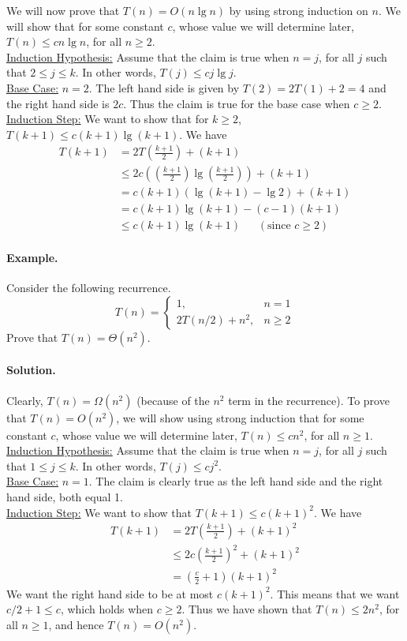 \documentclass[11pt,twoside]{article}
\def\ni{\noindent}
\begin{document}
\ni
We will now prove that $T(n)=O(n\lg n)$
by using strong induction on $n$. We will show that for 
some constant $c$, whose value we will determine later, $T(n)
\leq cn\lg n$, for all $n\geq 2$. \\
\underline{Induction Hypothesis:} Assume that the claim is true when
$n=j$, for all $j$ such that  $2\leq j\leq k$. In other words,
$T(j)\leq cj\lg j$. \\
\underline{Base Case:} $n=2$. The left
hand side is given by $T(2) = 2T(1) + 2 = 4$ and the right hand side
is $2c$. Thus the claim is true for the base case when $c\geq 2$.\\
\underline{Induction Step:} We want to show that for $k\geq 2$, $T(k+1)\leq
c(k+1)\lg (k+1)$. We have
\begin{align*}
T(k+1) & = 2T\left (\frac{k+1}{2}\right ) + (k+1) \\
       & \leq 2c\left (\left (\frac{k+1}{2}\right )\lg \left
(\frac{k+1}{2}\right )\right ) + (k+1) \\
       & = c(k+1)(\lg (k+1) - \lg 2)  + (k+1) \\
       & = c(k+1)\lg (k+1) - (c-1)(k+1)  \\
       & \leq c(k+1)\lg (k+1) ~~~~~~~ (\mbox{since } c\geq 2)
\end{align*}

\paragraph{Example.} Consider the following recurrence.
\[
T(n) = \left\{ \begin{array}{ll}
      1, & n = 1\\
      2T(n/2) + n^2, &  n \geq 2 
      \end{array} \right.
\]
Prove that $T(n)=\Theta(n^2)$.  
\paragraph{Solution.} Clearly, $T(n)=\Omega(n^2)$ (because of the
$n^2$ term in the recurrence). To prove that $T(n)=O(n^2)$, we will
show using strong induction that for 
some constant $c$, whose value we will determine later, $T(n)
\leq cn^2$, for all $n\geq 1$. \\
\underline{Induction Hypothesis:} Assume that the claim is true when
$n=j$, for all $j$ such that  $1\leq j\leq k$. In other words,
$T(j)\leq cj^2$. \\
\underline{Base Case:} $n=1$. The claim is clearly true as the left
hand side and the right hand side, both equal 1. \\
\underline{Induction Step:} We want to show that $T(k+1)\leq
c(k+1)^2$. We have
\begin{align*}
T(k+1) & = 2T\left (\frac{k+1}{2}\right ) + (k+1)^2 \\
       & \leq 2c\left (\frac{k+1}{2}\right )^2 + (k+1)^2 \\
       & = \left (\frac{c}{2} + 1\right )(k+1)^2 
\end{align*}
We want the right hand side to be at most $c(k+1)^2$. This means that we
want $c/2 + 1 \leq c$, which holds when $c\geq 2$. Thus we have shown
that $T(n)\leq 2n^2$, for all $n\geq 1$, and hence $T(n)=O(n^2)$.
\end{document}
